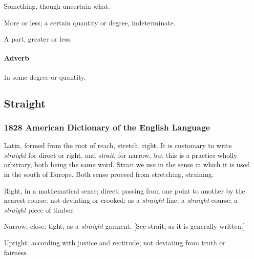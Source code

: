 				\begin{compactitem}
					\item[1] Something, though uncertain what.
					\item[2] More or less; a certain quantity or degree, indeterminate.
					\item[3] A part, greater or less.
				\end{compactitem}
		
			\paragraph{Adverb}
		
				\begin{compactitem}
					\item In some degree or quantity.
				\end{compactitem}
				
	\subsection{Straight} %
		\label{STRAIGHT}
	
		\subsubsection{1828 American Dictionary of the English Language}
		
			\begin{compactitem}
				\item Latin, formed from the root of reach, stretch, right. It is customary to write \textit{straight} for direct or right, and \textit{strait}, for narrow, but this is a practice wholly arbitrary, both being the same word. Strait we use in the sense in which it is used in the south of Europe. Both sense proceed from stretching, straining.
				\item[1] Right, in a mathematical sense; direct; passing from one point to another by the nearest course; not deviating or crooked; as a \textit{straight} line; a \textit{straight} course; a \textit{straight} piece of timber.
				\item[2] Narrow; close; tight; as a \textit{straight} garment. [See strait, as it is generally written.]
				\item[3] Upright; according with justice and rectitude; not deviating from truth or fairness.
			\end{compactitem}
				
